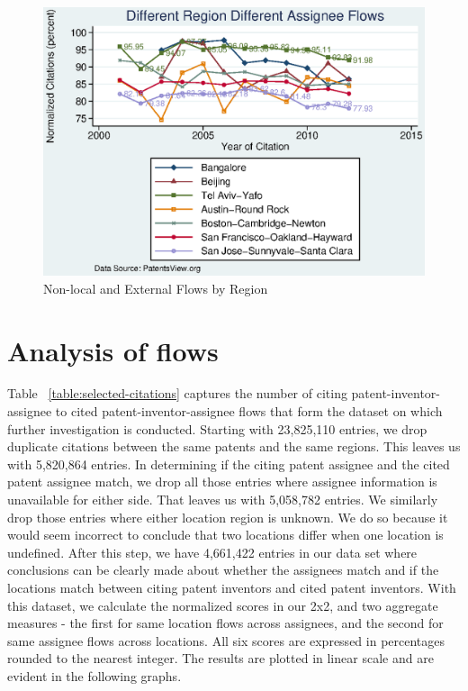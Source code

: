 \documentclass[12pt]{article}
\begin{document}
\begin{figure}[h]
\begin{centering}
  \includegraphics[width=\textwidth]{DiffRegionDiffAssigneeFlows}
  \caption{Non-local and External Flows by Region}
  \label{fig:DiffRegionDiffAssigneeFlows}
\end{centering}
\end{figure}

\section{Analysis of flows}\label{S:Analysis}

Table ~\ref{table:selected-citations} captures the number of citing patent-inventor-assignee to cited patent-inventor-assignee flows that form the dataset on which further investigation is conducted. Starting with 23,825,110 entries, we drop duplicate citations between the same patents and the same regions. This leaves us with 5,820,864 entries. In determining if the citing patent assignee and the cited patent assignee match, we drop all those entries where assignee information is unavailable for either side. That leaves us with  5,058,782 entries. We similarly drop those entries where either location region is unknown. We do so because it would seem incorrect to conclude that two locations differ when one location is undefined. After this step, we have 4,661,422 entries in our data set where conclusions can be clearly made about whether the assignees match and if the locations match between citing patent inventors and cited patent inventors. With this dataset, we calculate the normalized scores in our 2x2, and two aggregate measures - the first for same location flows across assignees, and the second for same assignee flows across locations. All six scores are expressed in percentages rounded to the nearest integer. The results are plotted in linear scale and are evident in the following graphs.
\end{document}

